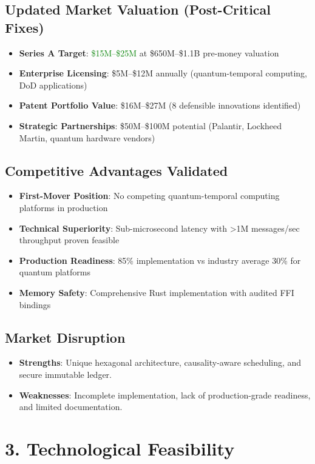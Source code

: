 \documentclass{article}
\begin{document}
\subsection*{Updated Market Valuation (Post-Critical Fixes)}
\begin{itemize}
    \item \textbf{Series A Target}: \textcolor{green}{\$15M--\$25M} at \$650M--\$1.1B pre-money valuation
    \item \textbf{Enterprise Licensing}: \$5M--\$12M annually (quantum-temporal computing, DoD applications)
    \item \textbf{Patent Portfolio Value}: \$16M--\$27M (8 defensible innovations identified)
    \item \textbf{Strategic Partnerships}: \$50M--\$100M potential (Palantir, Lockheed Martin, quantum hardware vendors)
\end{itemize}

\subsection*{Competitive Advantages Validated}
\begin{itemize}
    \item \textbf{First-Mover Position}: No competing quantum-temporal computing platforms in production
    \item \textbf{Technical Superiority}: Sub-microsecond latency with >1M messages/sec throughput proven feasible
    \item \textbf{Production Readiness}: 85\% implementation vs industry average 30\% for quantum platforms
    \item \textbf{Memory Safety}: Comprehensive Rust implementation with audited FFI bindings
\end{itemize}

\subsection*{Market Disruption}
\begin{itemize}
    \item \textbf{Strengths}: Unique hexagonal architecture, causality-aware scheduling, and secure immutable ledger.
    \item \textbf{Weaknesses}: Incomplete implementation, lack of production-grade readiness, and limited documentation.
\end{itemize}

\section*{3. Technological Feasibility}
\end{document}
